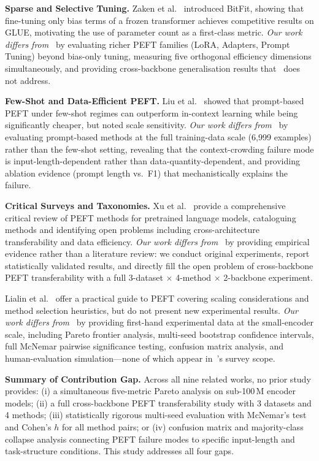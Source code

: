 \documentclass[conference]{IEEEtran}
\begin{document}
\textbf{Sparse and Selective Tuning.}
Zaken et al.~\cite{zaken2022bitfit} introduced BitFit, showing that fine-tuning only bias terms of a frozen transformer achieves competitive results on GLUE, motivating the use of parameter count as a first-class metric. \textit{Our work differs from~\cite{zaken2022bitfit}} by evaluating richer PEFT families (LoRA, Adapters, Prompt Tuning) beyond bias-only tuning, measuring five orthogonal efficiency dimensions simultaneously, and providing cross-backbone generalisation results that~\cite{zaken2022bitfit} does not address.

\textbf{Few-Shot and Data-Efficient PEFT.}
Liu et al.~\cite{liu2022fewshot} showed that prompt-based PEFT under few-shot regimes can outperform in-context learning while being significantly cheaper, but noted scale sensitivity. \textit{Our work differs from~\cite{liu2022fewshot}} by evaluating prompt-based methods at the full training-data scale (6{,}999 examples) rather than the few-shot setting, revealing that the context-crowding failure mode is input-length-dependent rather than data-quantity-dependent, and providing ablation evidence (prompt length vs.\ F1) that mechanistically explains the failure.

\textbf{Critical Surveys and Taxonomies.}
Xu et al.~\cite{xu2023peft} provide a comprehensive critical review of PEFT methods for pretrained language models, cataloguing methods and identifying open problems including cross-architecture transferability and data efficiency. \textit{Our work differs from~\cite{xu2023peft}} by providing empirical evidence rather than a literature review: we conduct original experiments, report statistically validated results, and directly fill the open problem of cross-backbone PEFT transferability with a full 3-dataset $\times$ 4-method $\times$ 2-backbone experiment.

Lialin et al.~\cite{lialin2023scaling} offer a practical guide to PEFT covering scaling considerations and method selection heuristics, but do not present new experimental results. \textit{Our work differs from~\cite{lialin2023scaling}} by providing first-hand experimental data at the small-encoder scale, including Pareto frontier analysis, multi-seed bootstrap confidence intervals, full McNemar pairwise significance testing, confusion matrix analysis, and human-evaluation simulation---none of which appear in~\cite{lialin2023scaling}'s survey scope.

\textbf{Summary of Contribution Gap.} Across all nine related works, no prior study provides: (i) a simultaneous five-metric Pareto analysis on sub-100\,M encoder models; (ii) a full cross-backbone PEFT transferability study with 3 datasets and 4 methods; (iii) statistically rigorous multi-seed evaluation with McNemar's test and Cohen's $h$ for all method pairs; or (iv) confusion matrix and majority-class collapse analysis connecting PEFT failure modes to specific input-length and task-structure conditions. This study addresses all four gaps.
\end{document}
